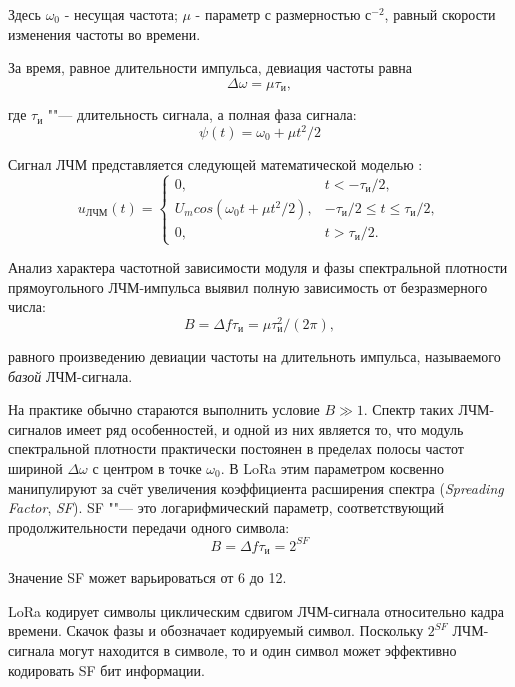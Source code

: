 Здесь $\omega_0$ - несущая частота; $\mu$ - параметр с размерностью с$^{-2}$, равный скорости изменения частоты во времени.

За время, равное длительности импульса, девиация частоты равна
\begin{equation}
	\Delta \omega = \mu \tau_{\text{и}},
\end{equation}

где $\tau_{\text{и}}$ ""--- длительность сигнала, а полная фаза сигнала:
\begin{equation}
	\psi(t) = \omega_0 + \mu t{^2}/2
\end{equation}

Сигнал ЛЧМ представляется следующей математической моделью \cite{Baskakov2003}:
\begin{equation}
	u_\text{ЛЧМ}(t) = 
	\begin{cases}
		0, & t < -\tau_\text{и}/2,\\
		U_m cos(\omega_0 t + \mu t{^2}/2), & -\tau_\text{и}/2 \le t \le \tau_\text{и}/2,\\
		0, & t > \tau_\text{и}/2.
	\end{cases}
\end{equation}

Анализ характера частотной зависимости модуля и фазы спектральной плотности прямоугольного ЛЧМ-импульса выявил \cite{Baskakov2003} полную зависимость от безразмерного числа:
\begin{equation}
	B = \Delta f \tau_\text{и} = \mu \tau^{2}_{\text{и}}/(2\pi),
\end{equation}

равного произведению девиации частоты на длительноть импульса, называемого \textit{базой} ЛЧМ-сигнала.

На практике обычно стараются выполнить условие $B \gg 1$. 
Спектр таких ЛЧМ-сигналов имеет ряд особенностей, и одной из них является то, что модуль спектральной плотности практически постоянен в пределах полосы частот шириной $\Delta \omega$ с центром в точке $\omega_0$.
В LoRa этим параметром косвенно манипулируют за счёт увеличения коэффициента расширения спектра (\textit{Spreading Factor}, \textit{SF}).
SF ""--- это логарифмический параметр, соответствующий продолжительности передачи одного символа:
\begin{equation}
	B = \Delta f \tau_\text{и} = 2^{SF}
\end{equation}

Значение SF может варьироваться от 6 до 12.

LoRa кодирует символы циклическим сдвигом ЛЧМ-сигнала относительно кадра 
времени. 
Скачок фазы и обозначает кодируемый символ.
Поскольку $2^{SF}$ ЛЧМ-сигнала могут находится в символе, то и один символ 
может эффективно кодировать SF бит информации.

